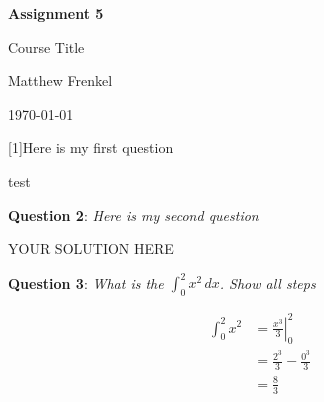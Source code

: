 \documentclass{article} %
\newcommand{\question}[2][]{\begin{flushleft}
        \textbf{Question #1}: \textit{#2}

\end{flushleft}}
\newcommand{\maketitletwo}[2][]{\begin{center}
        \Large{\textbf{Assignment #1}
            
            Course Title} %
        \vspace{5pt}
        
        \normalsize{Matthew Frenkel  %
        
        \today}        %
        \vspace{15pt}
        
\end{center}}
\begin{document}
    \maketitletwo[5]  %
    
    \question[1]{Here is my first question} 
    
    test
    
    \question[2]{Here is my second question}
    
    YOUR SOLUTION HERE
    
    \question[3]{What is the \Large{$\int_0^2 x^2 \, dx $}\normalsize{. Show all steps}}
    
    \begin{align*}
    \int_0^2 x^2 &= \left. \frac{x^3}{3} \right|_0^2 \\
                 &= \frac{2^3}{3}-\frac{0^3}{3}\\
                 &= \frac{8}{3}
    \end{align*}
\end{document}
